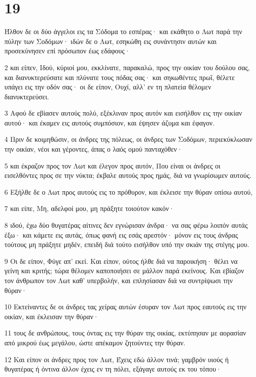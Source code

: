 \chapter{19}

\par Ήλθον δε οι δύο άγγελοι εις τα Σόδομα το εσπέρας· και εκάθητο ο Λωτ παρά την πύλην των Σοδόμων· ιδών δε ο Λωτ, εσηκώθη εις συνάντησιν αυτών και προσεκύνησεν επί πρόσωπον έως εδάφους·
\par 2 και είπεν, Ιδού, κύριοί μου, εκκλίνατε, παρακαλώ, προς την οικίαν του δούλου σας, και διανυκτερεύσατε και πλύνατε τους πόδας σας· και σηκωθέντες πρωΐ, θέλετε υπάγει εις την οδόν σας· οι δε είπον, Ουχί, αλλ' εν τη πλατεία θέλομεν διανυκτερεύσει.
\par 3 Αφού δε εβίασεν αυτούς πολύ, εξέκλιναν προς αυτόν και εισήλθον εις την οικίαν αυτού· και έκαμεν εις αυτούς συμπόσιον, και έψησεν άζυμα και έφαγον.
\par 4 Πριν δε κοιμηθώσιν, οι άνδρες της πόλεως, οι άνδρες των Σοδόμων, περιεκύκλωσαν την οικίαν, νέοι και γέροντες, άπας ο λαός ομού πανταχόθεν·
\par 5 και έκραζον προς τον Λωτ και έλεγον προς αυτόν, Που είναι οι άνδρες οι εισελθόντες προς σε την νύκτα; έκβαλε αυτούς προς ημάς, διά να γνωρίσωμεν αυτούς.
\par 6 Εξήλθε δε ο Λωτ προς αυτούς εις το πρόθυρον, και έκλεισε την θύραν οπίσω αυτού,
\par 7 και είπε, Μη, αδελφοί μου, μη πράξητε τοιούτον κακόν·
\par 8 ιδού, έχω δύο θυγατέρας αίτινες δεν εγνώρισαν άνδρα· να σας φέρω λοιπόν αυτάς έξω· και κάμετε εις αυτάς, όπως φανή εις εσάς αρεστόν· μόνον εις τους άνδρας τούτους μη πράξητε μηδέν, επειδή διά τούτο εισήλθον υπό την σκιάν της στέγης μου.
\par 9 Οι δε είπον, Φύγε απ' εκεί. Και είπον, ούτος ήλθε διά να παροικήση· θέλει να γείνη και κριτής; τώρα θέλομεν καποποιήσει σε μάλλον παρά εκείνους. Και εβίαζον τον άνθρωπον τον Λωτ καθ' υπερβολήν, και επλησίασαν διά να συντρίψωσι την θύραν·
\par 10 Εκτείναντες δε οι άνδρες τας χείρας αυτών έσυραν τον Λωτ προς εαυτούς εις την οικίαν, και έκλεισαν την θύραν·
\par 11 τους δε ανθρώπους, τους όντας εις την θύραν της οικίας, εκτύπησαν με αορασίαν από μικρού έως μεγάλου, ώστε απέκαμον ζητούντες την θύραν.
\par 12 Και είπον οι άνδρες προς τον Λωτ, Έχεις εδώ άλλον τινά; γαμβρόν υιούς ή θυγατέρας ή όντινα άλλον έχεις εν τη πόλει, εξάγαγε αυτούς εκ του τόπου·
